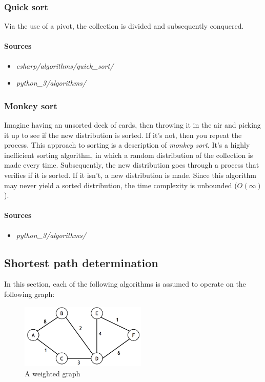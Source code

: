 \documentclass{article}
\begin{document}
\subsubsection{Quick sort}
Via the use of a pivot, the collection is divided and subsequently conquered.

\paragraph{Sources}
\begin{itemize}
\item{{\em csharp/algorithms/quick\_sort/}}
\item{{\em python\_3/algorithms/}}
\end{itemize}


\subsubsection{Monkey sort}
Imagine having an unsorted deck of cards, then throwing it in the air and picking it up to see if the new
distribution is sorted. If it's not, then you repeat the process. This approach to sorting is a description of
{\em monkey sort}. It's a highly inefficient sorting algorithm, in which a random distribution of the collection
is made every time. Subsequently, the new distribution goes through a process that verifies if it is sorted.
If it isn't, a new distribution is made. Since this algorithm may never yield a sorted distribution,
the time complexity is unbounded (\(O(\infty)\)).

\paragraph{Sources}
\begin{itemize}
\item{{\em python\_3/algorithms/}}
\end{itemize}


\newpage


\subsection{Shortest path determination}
In this section, each of the following algorithms is assumed to operate on the following graph:

\begin{figure}[H]
  \centering
  \includegraphics[width=6cm]{sample_graph}
  \caption{A weighted graph}
\end{figure}
\end{document}

